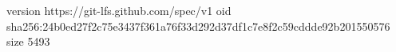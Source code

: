 version https://git-lfs.github.com/spec/v1
oid sha256:24b0ed27f2c75e3437f361a76f33d292d37df1c7e8f2c59cddde92b201550576
size 5493
